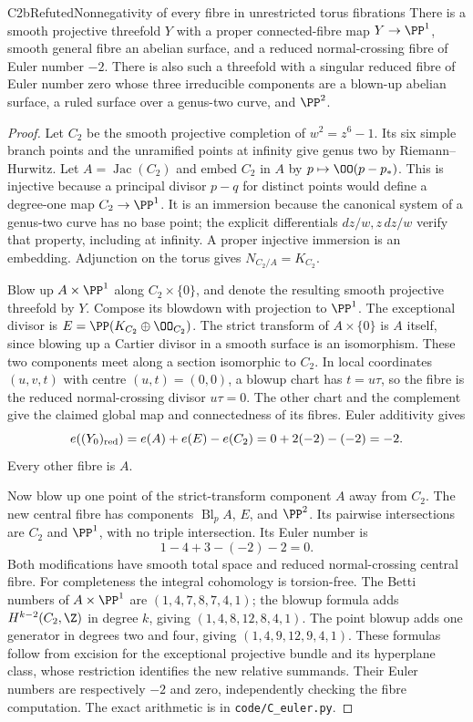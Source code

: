 \begin{statement}{C2b}{Refuted}{Nonnegativity of every fibre in unrestricted torus fibrations}
There is a smooth projective threefold $Y$ with a proper connected-fibre map $Y\to\PP^1$, smooth general fibre an abelian surface, and a reduced normal-crossing fibre of Euler number $-2$. There is also such a threefold with a singular reduced fibre of Euler number zero whose three irreducible components are a blown-up abelian surface, a ruled surface over a genus-two curve, and $\PP^2$.
\end{statement}
\begin{proof}
Let $C_2$ be the smooth projective completion of $w^2=z^6-1$. Its six simple branch points and the unramified points at infinity give genus two by Riemann--Hurwitz. Let $A=\operatorname{Jac}(C_2)$ and embed $C_2$ in $A$ by $p\mapsto\OO(p-p_*)$. This is injective because a principal divisor $p-q$ for distinct points would define a degree-one map $C_2\to\PP^1$. It is an immersion because the canonical system of a genus-two curve has no base point; the explicit differentials $dz/w,z\,dz/w$ verify that property, including at infinity. A proper injective immersion is an embedding. Adjunction on the torus gives $N_{C_2/A}=K_{C_2}$.

Blow up $A\times\PP^1$ along $C_2\times\{0\}$, and denote the resulting smooth projective threefold by $Y$. Compose its blowdown with projection to $\PP^1$. The exceptional divisor is $E=\PP(K_{C_2}\oplus\OO_{C_2})$. The strict transform of $A\times\{0\}$ is $A$ itself, since blowing up a Cartier divisor in a smooth surface is an isomorphism. These two components meet along a section isomorphic to $C_2$. In local coordinates $(u,v,t)$ with centre $(u,t)=(0,0)$, a blowup chart has $t=u\tau$, so the fibre is the reduced normal-crossing divisor $u\tau=0$. The other chart and the complement give the claimed global map and connectedness of its fibres. Euler additivity gives
\[
 e((Y_0)_{\rm red})=e(A)+e(E)-e(C_2)=0+2(-2)-(-2)=-2.
\]
Every other fibre is $A$.

Now blow up one point of the strict-transform component $A$ away from $C_2$. The new central fibre has components $\operatorname{Bl}_pA$, $E$, and $\PP^2$. Its pairwise intersections are $C_2$ and $\PP^1$, with no triple intersection. Its Euler number is
\[
1-4+3-(-2)-2=0.
\]
Both modifications have smooth total space and reduced normal-crossing central fibre. For completeness the integral cohomology is torsion-free. The Betti numbers of $A\times\PP^1$ are $(1,4,7,8,7,4,1)$; the blowup formula adds $H^{k-2}(C_2,\Z)$ in degree $k$, giving $(1,4,8,12,8,4,1)$. The point blowup adds one generator in degrees two and four, giving $(1,4,9,12,9,4,1)$. These formulas follow from excision for the exceptional projective bundle and its hyperplane class, whose restriction identifies the new relative summands. Their Euler numbers are respectively $-2$ and zero, independently checking the fibre computation. The exact arithmetic is in \texttt{code/C\_euler.py}.
\end{proof}

